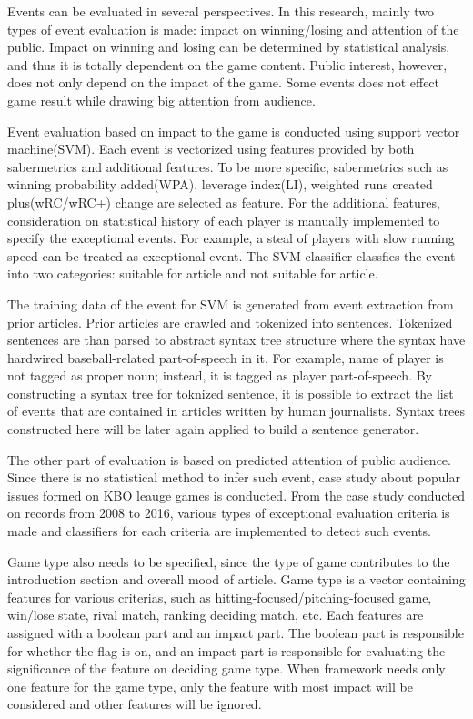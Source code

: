 \documentclass[11pt,letterpaper]{article}
\begin{document}
Events can be evaluated in several perspectives. In this research, mainly two types of event evaluation is made: impact on winning/losing and attention of the public. Impact on winning and losing can be determined by statistical analysis, and thus it is totally dependent on the game content. Public interest, however, does not only depend on the impact of the game. Some events does not effect game result while drawing big attention from audience. 

Event evaluation based on impact to the game is conducted using support vector machine(SVM). Each event is vectorized using features provided by both sabermetrics and additional features. To be more specific, sabermetrics such as winning probability added(WPA), leverage index(LI), weighted runs created plus(wRC/wRC+) change are selected as feature. For the additional features, consideration on statistical history of each player is manually implemented to specify the exceptional events. For example, a steal of players with slow running speed can be treated as exceptional event. The SVM classifier classfies the event into two categories: suitable for article and not suitable for article. 

The training data of the event for SVM is generated from event extraction from prior articles. Prior articles are crawled and tokenized into sentences. Tokenized sentences are than parsed to abstract syntax tree structure where the syntax have hardwired baseball-related part-of-speech in it. For example, name of player is not tagged as proper noun; instead, it is tagged as player part-of-speech. By constructing a syntax tree for toknized sentence, it is possible to extract the list of events that are contained in articles written by human journalists. Syntax trees constructed here will be later again applied to build a sentence generator. 

The other part of evaluation is based on predicted attention of public audience. Since there is no statistical method to infer such event, case study about popular issues formed on KBO leauge games is conducted. From the case study conducted on records from 2008 to 2016, various types of exceptional evaluation criteria is made and classifiers for each criteria are implemented to detect such events.

Game type also needs to be specified, since the type of game contributes to the introduction section and overall mood of article. Game type is a vector containing features for various criterias, such as hitting-focused/pitching-focused game, win/lose state, rival match, ranking deciding match, etc. Each features are assigned with a boolean part and an impact part. The boolean part is responsible for whether the flag is on, and an impact part is responsible for evaluating the significance of the feature on deciding game type. When framework needs only one feature for the game type, only the feature with most impact will be considered and other features will be ignored.
\end{document}
